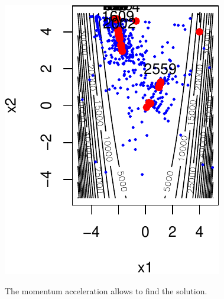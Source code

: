 \documentclass[12pt]{beamer}
\begin{document}
\begin{frame}
\begin{center}
\begin{minipage}[c]{0.35\textwidth}
\begin{center}
\includegraphics[width=\textwidth]{momentum_rosen_LS_budg4000_x-crop.pdf} 
\end{center}
\end{minipage}
\end{center}
The momentum acceleration allows to find the solution.
\end{frame}
\end{document}
